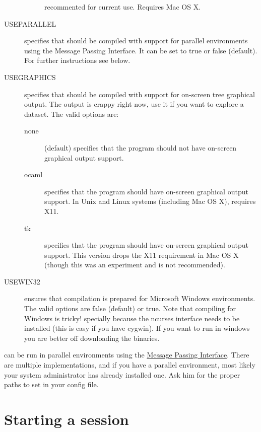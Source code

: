 \begin{description}
\begin{description}
                recommented for current use. Requires Mac OS X.
        \end{description}
    \item [USEPARALLEL] specifies that \poy should be compiled with support for
        parallel environments using the Message Passing Interface. It can be set
        to true or false (default). For further instructions see below.
    \item[USEGRAPHICS] specifies that \poy should be compiled with support for
        on-screen tree graphical output. The output is crappy right now, use it
        if you want to explore a dataset. The valid options are:
        \begin{description}
            \item[none] (default) specifies that the program should not have
                on-screen graphical output support.
            \item[ocaml] specifies that the program should have on-screen
                graphical output support. In Unix and Linux systems (including
                Mac OS X), requires X11.
            \item[tk] specifies that the program should have on-screen graphical
                output support. This version drops the X11 requirement in Mac OS
                X (though this was an experiment and is not recommended).
        \end{description}
    \item [USEWIN32] ensures that compilation is prepared for Microsoft Windows
        environments. The valid options are false (default) or true. Note that
        compiling for Windows is tricky! specially because the ncurses interface
        needs to be installed (this is easy if you have cygwin). If you want to
        run \poy in windows you are better off downloading the binaries.
\end{description}

\poy can be run in parallel environments using the
\href{http://www-unix.mcs.anl.gov/mpi/}{Message Passing Interface}. There are
multiple implementations, and if you have a parallel environment, most likely
your system administrator has already installed one. Ask him for the proper
paths to set in your config file.

\section{Starting a \poy session}

